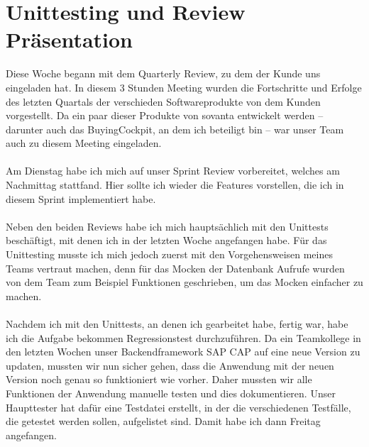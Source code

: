 \section{Unittesting und Review Präsentation}
Diese Woche begann mit dem Quarterly Review, zu dem der Kunde uns eingeladen hat. In diesem 3 Stunden Meeting wurden die Fortschritte und Erfolge des letzten Quartals der verschieden Softwareprodukte von dem Kunden vorgestellt. Da ein paar dieser Produkte von sovanta entwickelt werden – darunter auch das BuyingCockpit, an dem ich beteiligt bin – war unser Team auch zu diesem Meeting eingeladen. \\\\
Am Dienstag habe ich mich auf unser Sprint Review vorbereitet, welches am Nachmittag stattfand. Hier sollte ich wieder die Features vorstellen, die ich in diesem Sprint implementiert habe. \\\\
Neben den beiden Reviews habe ich mich hauptsächlich mit den Unittests beschäftigt, mit denen ich in der letzten Woche angefangen habe. Für das Unittesting musste ich mich jedoch zuerst mit den Vorgehensweisen meines Teams vertraut machen, denn für das Mocken der Datenbank Aufrufe wurden von dem Team zum Beispiel Funktionen geschrieben, um das Mocken einfacher zu machen. \\\\
Nachdem ich mit den Unittests, an denen ich gearbeitet habe, fertig war, habe ich die Aufgabe bekommen Regressionstest durchzuführen. Da ein Teamkollege in den letzten Wochen unser Backendframework SAP CAP auf eine neue Version zu updaten, mussten wir nun sicher gehen, dass die Anwendung mit der neuen Version noch genau so funktioniert wie vorher. Daher mussten wir alle Funktionen der Anwendung manuelle testen und dies dokumentieren. Unser Haupttester hat dafür eine Testdatei erstellt, in der die verschiedenen Testfälle, die getestet werden sollen, aufgelistet sind. Damit habe ich dann Freitag angefangen. \\\\

